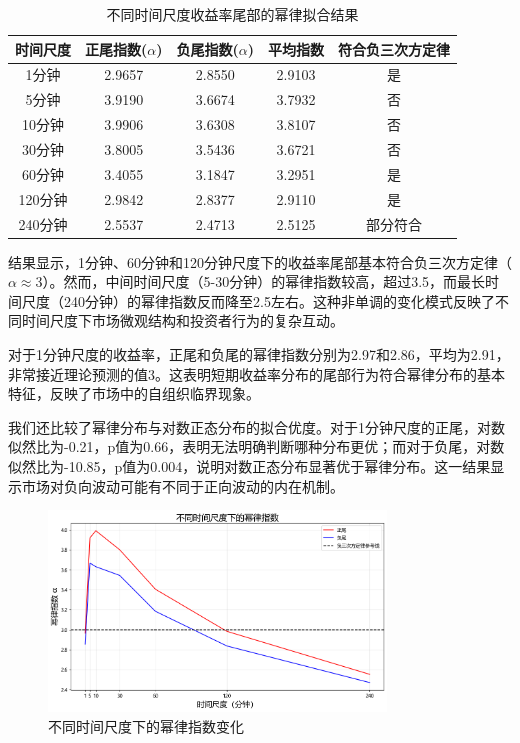 \documentclass[12pt, a4paper]{article}
\begin{document}
\begin{table}[htbp]
\centering
\caption{不同时间尺度收益率尾部的幂律拟合结果}
\label{tab:power_law_fit}
\begin{tabular}{ccccc}
\toprule
时间尺度 & 正尾指数($\alpha$) & 负尾指数($\alpha$) & 平均指数 & 符合负三次方定律 \\
\midrule
1分钟 & 2.9657 & 2.8550 & 2.9103 & 是 \\
5分钟 & 3.9190 & 3.6674 & 3.7932 & 否 \\
10分钟 & 3.9906 & 3.6308 & 3.8107 & 否 \\
30分钟 & 3.8005 & 3.5436 & 3.6721 & 否 \\
60分钟 & 3.4055 & 3.1847 & 3.2951 & 是 \\
120分钟 & 2.9842 & 2.8377 & 2.9110 & 是 \\
240分钟 & 2.5537 & 2.4713 & 2.5125 & 部分符合 \\
\bottomrule
\end{tabular}
\end{table}

结果显示，1分钟、60分钟和120分钟尺度下的收益率尾部基本符合负三次方定律（$\alpha \approx 3$）。然而，中间时间尺度（5-30分钟）的幂律指数较高，超过3.5，而最长时间尺度（240分钟）的幂律指数反而降至2.5左右。这种非单调的变化模式反映了不同时间尺度下市场微观结构和投资者行为的复杂互动。

对于1分钟尺度的收益率，正尾和负尾的幂律指数分别为2.97和2.86，平均为2.91，非常接近理论预测的值3。这表明短期收益率分布的尾部行为符合幂律分布的基本特征，反映了市场中的自组织临界现象。

我们还比较了幂律分布与对数正态分布的拟合优度。对于1分钟尺度的正尾，对数似然比为-0.21，p值为0.66，表明无法明确判断哪种分布更优；而对于负尾，对数似然比为-10.85，p值为0.004，说明对数正态分布显著优于幂律分布。这一结果显示市场对负向波动可能有不同于正向波动的内在机制。

\begin{figure}[htbp]
\centering
\includegraphics[width=0.8\textwidth]{../assets/img/幂律指数变化.png}
\caption{不同时间尺度下的幂律指数变化}
\label{fig:power_law_exponents}
\end{figure}
\end{document}
